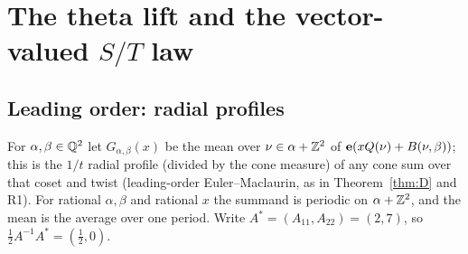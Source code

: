 
\section{The theta lift and the vector-valued $S/T$ law}\label{sec:lift}

\subsection{Leading order: radial profiles}\label{sec:lead}
For $\alpha,\beta\in\mathbb{Q}^2$ let $G_{\alpha,\beta}(x)$ be the mean over $\nu\in\alpha+\mathbb{Z}^2$ of $\mathbf{e}(xQ(\nu)+B(\nu,\beta))$; this is the $1/t$
radial profile (divided by the cone measure) of any cone sum over that coset and twist (leading-order Euler--Maclaurin, as in
Theorem~\ref{thm:D} and R1). For rational $\alpha,\beta$ and rational $x$ the summand is periodic on $\alpha+\mathbb{Z}^2$, and the mean is the average over
one period. Write $A^*=(A_{11},A_{22})=(2,7)$, so $\tfrac12A^{-1}A^*=(\tfrac12,0)$.

